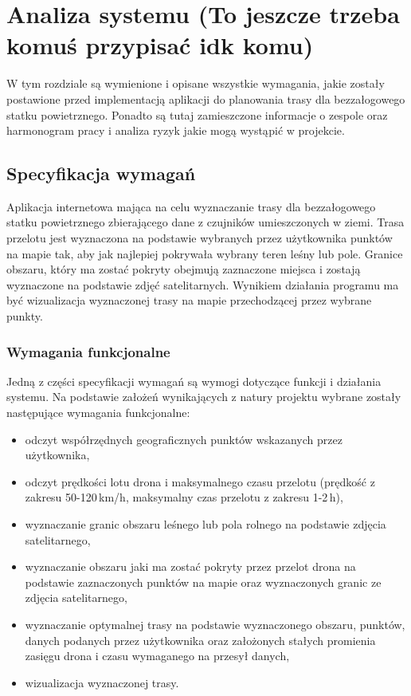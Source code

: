 \chapter{Analiza systemu (To jeszcze trzeba komuś przypisać idk komu)}
\label{chap:system analysis}

W tym rozdziale są wymienione i opisane wszystkie wymagania, jakie zostały postawione przed implementacją aplikacji do planowania trasy dla bezzałogowego statku powietrznego. Ponadto są tutaj zamieszczone informacje o zespole oraz harmonogram pracy i analiza ryzyk jakie mogą wystąpić w projekcie.

\section{Specyfikacja wymagań}

Aplikacja internetowa mająca na celu wyznaczanie trasy dla bezzałogowego statku powietrznego zbierającego dane z czujników umieszczonych w ziemi. Trasa przelotu jest wyznaczona na podstawie wybranych przez użytkownika punktów na mapie tak, aby jak najlepiej pokrywała wybrany teren leśny lub pole. Granice obszaru, który ma zostać pokryty obejmują zaznaczone miejsca i zostają wyznaczone na podstawie zdjęć satelitarnych. Wynikiem działania programu ma być wizualizacja wyznaczonej trasy na mapie przechodzącej przez wybrane punkty.

\subsection{Wymagania funkcjonalne}
Jedną z części specyfikacji wymagań są wymogi dotyczące funkcji i działania systemu. Na podstawie założeń wynikających z natury projektu wybrane zostały następujące wymagania funkcjonalne: 
\begin{itemize}
    \item odczyt współrzędnych geograficznych punktów wskazanych przez użytkownika,
    \item odczyt prędkości lotu drona i maksymalnego czasu przelotu (prędkość z zakresu 50-120\,km/h, maksymalny czas przelotu z zakresu 1-2\,h),
    \item wyznaczanie granic obszaru leśnego lub pola rolnego na podstawie zdjęcia satelitarnego,
    \item wyznaczanie obszaru jaki ma zostać pokryty przez przelot drona na podstawie zaznaczonych punktów na mapie oraz wyznaczonych granic ze zdjęcia satelitarnego,
    \item wyznaczanie optymalnej trasy na podstawie wyznaczonego obszaru, punktów, danych podanych przez użytkownika oraz założonych stałych promienia zasięgu drona i czasu wymaganego na przesył danych,
    \item wizualizacja wyznaczonej trasy.
\end{itemize}

